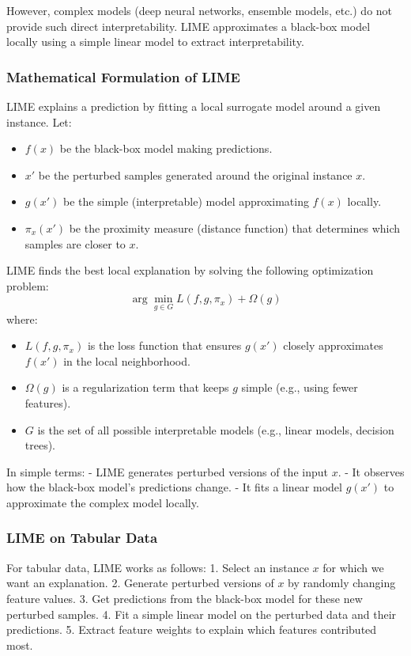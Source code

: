 However, complex models (deep neural networks, ensemble models, etc.) do not provide such direct interpretability. LIME approximates a black-box model locally using a simple linear model to extract interpretability.

\subsubsection{Mathematical Formulation of LIME}
LIME explains a prediction by fitting a local surrogate model around a given instance. Let:
\begin{itemize}
    \item \( f(x) \) be the black-box model making predictions.
    \item \( x' \) be the perturbed samples generated around the original instance \( x \).
    \item \( g(x') \) be the simple (interpretable) model approximating \( f(x) \) locally.
    \item \( \pi_x(x') \) be the proximity measure (distance function) that determines which samples are closer to \( x \).
\end{itemize}

LIME finds the best local explanation by solving the following optimization problem:
\begin{equation}
    \arg \min_{g \in G} L(f, g, \pi_x) + \Omega(g)
\end{equation}
where:
\begin{itemize}
    \item \( L(f, g, \pi_x) \) is the loss function that ensures \( g(x') \) closely approximates \( f(x') \) in the local neighborhood.
    \item \( \Omega(g) \) is a regularization term that keeps \( g \) simple (e.g., using fewer features).
    \item \( G \) is the set of all possible interpretable models (e.g., linear models, decision trees).
\end{itemize}

In simple terms:
- LIME generates perturbed versions of the input \( x \).
- It observes how the black-box model's predictions change.
- It fits a linear model \( g(x') \) to approximate the complex model locally.

\subsubsection{LIME on Tabular Data}
For tabular data, LIME works as follows:
1. Select an instance \( x \) for which we want an explanation.
2. Generate perturbed versions of \( x \) by randomly changing feature values.
3. Get predictions from the black-box model for these new perturbed samples.
4. Fit a simple linear model on the perturbed data and their predictions.
5. Extract feature weights to explain which features contributed most.


